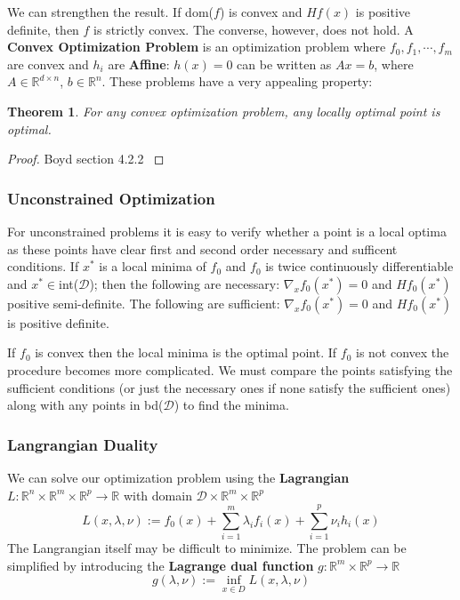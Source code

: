 \documentclass[]{article}
\theoremstyle{mattstyle}
\newtheorem{theorem}{Theorem}[section]
\theoremstyle{definition}
\begin{document}
We can strengthen the result. If dom($f$) is convex and $Hf(x)$ is positive definite, then $f$ is strictly convex. The converse, however, does not hold. A \textbf{Convex Optimization Problem} is an optimization problem where $f_0, f_1, \cdots, f_m$ are convex and $h_i$ are \textbf{Affine}: $h(x) = 0$ can be written as $Ax = b$, where $A \in \mathbb{R}^{d \times n}$, $b\in\mathbb{R}^n$. These problems have a very appealing property: 
\begin{theorem}
	For any convex optimization problem, any locally optimal point is optimal.
\end{theorem}
\begin{proof}
	Boyd section 4.2.2 \cite{Boyd:2004:CO:993483} 
\end{proof}

\subsubsection{Unconstrained Optimization}

For unconstrained problems it is easy to verify whether a point is a local optima as these points have clear first and second order necessary and sufficent conditions. If $x^*$ is a local minima of $f_0$ and $f_0$ is twice continuously differentiable and $x^* \in$int($\mathcal{D}$); then the following are necessary:
$\nabla_{x}f_0(x^*)=0$ and $Hf_{0}(x^*)$ positive semi-definite. The following are sufficient: $\nabla_{x}f_0(x^*)=0$ and $Hf_{0}(x^*)$ is positive definite.

If $f_0$ is convex then the local minima is the optimal point. If $f_0$ is not convex the procedure becomes more complicated. We must compare the points satisfying the sufficient conditions (or just the necessary ones if none satisfy the sufficient ones) along with any points in bd($\mathcal{D}$) to find the minima.

\subsubsection{Langrangian Duality}
We can solve our optimization problem using the \textbf{Lagrangian} $L: \mathbb{R}^n\times \mathbb{R}^m\times \mathbb{R}^p \rightarrow \mathbb{R} $ with domain $\mathcal{D}\times\mathbb{R}^m\times \mathbb{R}^p$
\begin{equation}\label{eq:primal}
L(x,\lambda,\nu) := f_0(x) + \sum_{i=1}^m \lambda_if_i(x) + \sum_{i=1}^p \nu_i h_i(x)
\end{equation}
The Langrangian itself may be difficult to minimize. The problem can be simplified by introducing the \textbf{Lagrange dual function} $g: \mathbb{R}^m\times \mathbb{R}^p \rightarrow \mathbb{R}$
\begin{equation}\label{eq:dual}
g(\lambda,\nu) :=\inf\limits_{x\in D} L(x,\lambda,\nu)
\end{equation}
\end{document}
